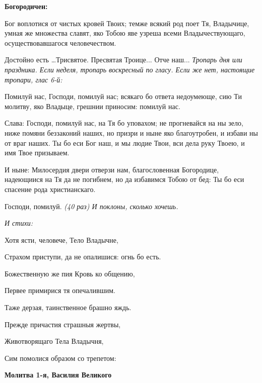 \medskip
\bfseries Богородичен:\normalfont{}

Бог воплотися от чистых кровей Твоих; темже всякий род поет Тя, Владычице, умная же множества славят, яко Тобою яве узреша всеми Владычествующаго, осуществовавшагося человечеством.

\medskip
Достойно есть …Трисвятое. Пресвятая Троице... Отче наш... \itshape Тропарь дня или праздника.\normalfont{} \itshape Если неделя, тропарь воскресный по гласу. Если же нет, настоящие тропари, глас 6-й:\normalfont{}


Помилуй нас, Господи, помилуй нас; всякаго бо ответа недоумеюще, сию Ти молитву, яко Владыце, грешнии приносим: помилуй нас.


Слава: Господи, помилуй нас, на Тя бо уповахом; не прогневайся на ны зело, ниже помяни беззаконий наших, но призри и ныне яко благоутробен, и избави ны от враг наших. Ты бо еси Бог наш, и мы людие Твои, вси дела руку Твоею, и имя Твое призываем.


И ныне: Милосердия двери отверзи нам, благословенная Богородице, надеющиися на Тя да не погибнем, но да избавимся Тобою от бед: Ты бо еси спасение рода христианскаго.


Господи, помилуй. \itshape (40 раз)\normalfont{} \itshape И поклоны, сколько хочешь.


\normalfont{}


\itshape И стихи:\normalfont{}


Хотя ясти, человече, Тело Владычне,


Страхом приступи, да не опалишися: огнь бо есть.


Божественную же пия Кровь ко общению,


Первее примирися тя опечалившим.


Таже дерзая, таинственное брашно яждь.


Прежде причастия страшныя жертвы,


Животворящаго Тела Владычня,


Сим помолися образом со трепетом:


\medskip
\bfseries Молитва 1-я, Василия Великого\normalfont{}


